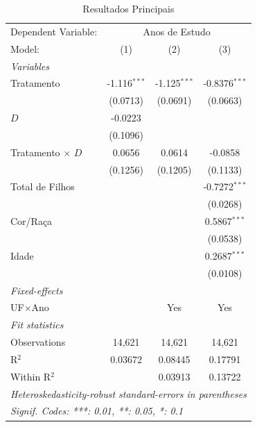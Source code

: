 
\begin{table}[htbp]
   \caption{\label{tab:dif_principal} Resultados Principais}
   \centering
\begin{tabular*}{\textwidth}{@{\extracolsep{\fill}}lccc}
      \tabularnewline \midrule \midrule
      Dependent Variable: & \multicolumn{3}{c}{Anos de Estudo}\\
      Model:                          & (1)            & (2)            & (3)\\  
      \midrule
      \emph{Variables}\\
      Tratamento                      & -1.116$^{***}$ & -1.125$^{***}$ & -0.8376$^{***}$\\   
                                      & (0.0713)       & (0.0691)       & (0.0663)\\   
      $D$                       & -0.0223        &                &   \\   
                                      & (0.1096)       &                &   \\   
      Tratamento $\times$ $D$   & 0.0656         & 0.0614         & -0.0858\\   
                                      & (0.1256)       & (0.1205)       & (0.1133)\\   
      Total de Filhos                 &                &                & -0.7272$^{***}$\\   
                                      &                &                & (0.0268)\\   
      Cor/Raça                        &                &                & 0.5867$^{***}$\\   
                                      &                &                & (0.0538)\\   
      Idade                           &                &                & 0.2687$^{***}$\\   
                                      &                &                & (0.0108)\\   
      \midrule
      \emph{Fixed-effects}\\
      UF$	\times$Ano                   &                & Yes            & Yes\\  
      \midrule
      \emph{Fit statistics}\\
      Observations                    & 14,621         & 14,621         & 14,621\\  
      R$^2$                           & 0.03672        & 0.08445        & 0.17791\\  
      Within R$^2$                    &                & 0.03913        & 0.13722\\  
      \midrule \midrule
      \multicolumn{4}{l}{\emph{Heteroskedasticity-robust standard-errors in parentheses}}\\
      \multicolumn{4}{l}{\emph{Signif. Codes: ***: 0.01, **: 0.05, *: 0.1}}\\
   \end{tabular*}
\end{table}


